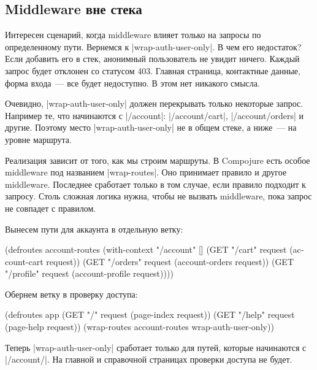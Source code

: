 \subsection{Middleware вне стека}

Интересен сценарий, когда middleware влияет только на запросы по определенному
пути. Вернемся к \spverb|wrap-auth-user-only|. В чем его недостаток? Если
добавить его в стек, анонимный пользователь не увидит ничего. Каждый запрос
будет отклонен со статусом 403. Главная страница, контактные данные, форма
входа~--- все будет недоступно. В этом нет никакого смысла.

Очевидно, \spverb|wrap-auth-user-only| должен перекрывать только некоторые
запрос. Например те, что начинаются с \spverb|/account|: \spverb|/account/cart|,
\spverb|/account/orders| и другие. Поэтому место \spverb|wrap-auth-user-only| не
в общем стеке, а ниже~--- на уровне маршрута.

Реализация зависит от того, как мы строим маршруты. В Compojure есть особое
middleware под названием \spverb|wrap-routes|. Оно принимает правило и другое
middleware. Последнее сработает только в том случае, если правило подходит к
запросу. Столь сложная логика нужна, чтобы не вызвать middleware, пока запрос не
совпадет с правилом.

Вынесем пути для аккаунта в отдельную ветку:

\begin{english}
  \begin{clojure}
(defroutes account-routes
  (with-context "/account" []
    (GET "/cart" request (account-cart request))
    (GET "/orders" request (account-orders request))
    (GET "/profile" request (account-profile request))))
  \end{clojure}
\end{english}

\noindent
Обернем ветку в проверку доступа:

\begin{english}
  \begin{clojure}
(defroutes app
  (GET "/" request (page-index request))
  (GET "/help" request (page-help request))
  (wrap-routes account-routes wrap-auth-user-only))
  \end{clojure}
\end{english}

Теперь \spverb|wrap-auth-user-only| сработает только для путей, которые
начинаются с \spverb|/account/|. На главной и справочной страницах проверки
доступа не будет.

